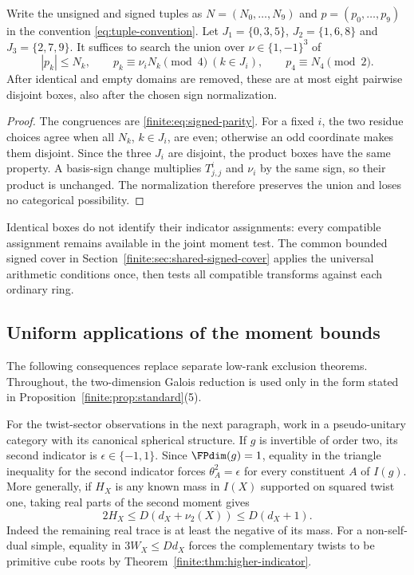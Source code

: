 \begin{lemma}
\label{finite:cor:parity-restricted-enumeration}
Write the unsigned and signed tuples as $N=(N_0,\ldots,N_9)$ and
$p=(p_0,\ldots,p_9)$ in the convention \eqref{eq:tuple-convention}.
Let $J_1=\{0,3,5\}$, $J_2=\{1,6,8\}$ and $J_3=\{2,7,9\}$.
It suffices to search the union over $\nu\in\{1,-1\}^3$ of
\[
 |p_k|\le N_k,\qquad p_k\equiv\nu_iN_k\pmod4\ (k\in J_i),
 \qquad p_4\equiv N_4\pmod2.
\]
After identical and empty domains are removed, these are at most
eight pairwise disjoint boxes, also after the chosen sign normalization.
\end{lemma}
\begin{proof}
The congruences are \eqref{finite:eq:signed-parity}. For a fixed $i$,
the two residue choices agree when all $N_k$, $k\in J_i$, are even;
otherwise an odd coordinate makes them disjoint. Since the three
$J_i$ are disjoint, the product boxes have the same property.
A basis-sign change multiplies $T_{j,j}^i$ and $\nu_i$ by the same
sign, so their product is unchanged. The normalization therefore
preserves the union and loses no categorical possibility.
\end{proof}
Identical boxes do not identify their indicator assignments: every
compatible assignment remains available in the joint moment test.
The common bounded signed cover in
Section~\ref{finite:sec:shared-signed-cover} applies the universal
arithmetic conditions once, then tests all compatible transforms
against each ordinary ring.

\subsection{Uniform applications of the moment bounds}\label{finite:sec:applications}
The following consequences replace separate low-rank exclusion theorems.
Throughout, the two-dimension Galois reduction is used only in the form
stated in Proposition~\ref{finite:prop:standard}(5).

For the twist-sector observations in the next paragraph, work in a
pseudo-unitary category with its canonical spherical structure.
If $g$ is invertible of order two, its second indicator is
$\epsilon\in\{-1,1\}$. Since $\FPdim(g)=1$, equality in the triangle
inequality for the second indicator forces $\theta_A^2=\epsilon$ for
every constituent $A$ of $I(g)$. More generally, if $H_X$ is any known
mass in $I(X)$ supported on squared twist one, taking real parts of the
second moment gives
\begin{equation}\label{finite:eq:square-sector}
 2H_X\leq D(d_X+\nu_2(X))\leq D(d_X+1).
\end{equation}
Indeed the remaining real trace is at least the negative of its mass.
For a non-self-dual simple, equality in
$3W_X\leq Dd_X$ forces the complementary twists to be primitive cube
roots by Theorem~\ref{finite:thm:higher-indicator}.

